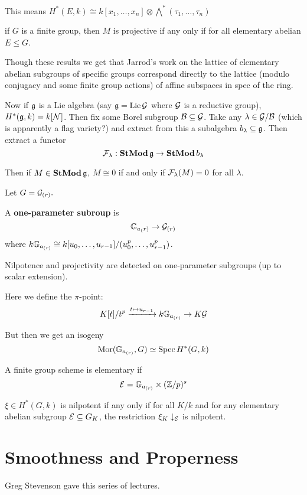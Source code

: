 \documentclass[12pt]{article}
\begin{document}
This means $H^\ast(E,k)\cong k[x_1,\dots,x_n]\otimes \bigwedge^\ast(\tau_1,\dots,\tau_n)$
\begin{thm}[Chouinard '76]
	if $G$ is a finite group, then $M$ is projective if any only if for all elementary abelian $E\le G$.
\end{thm}

Though these results we get that Jarrod's work on the lattice of elementary abelian subgroups of specific groups correspond directly to the lattice (modulo conjugacy and some finite 
group actions) of affine subspaces in spec of the ring.

Now if $\mathfrak{g}$ is a Lie algebra (say $\mathfrak{g}=\operatorname{Lie}\mathcal{G}$ where $\mathcal{G}$ is a reductive group), 
$H^\ast(\mathfrak{g},k)=k[\mathcal{N}]$. Then fix some Borel subgroup $\mathcal{B}\subseteq \mathcal{G}$. Take any $\lambda\in \mathcal{G}/\mathcal{B}$ (which is apparently a flag variety?)
and extract from this a subalgebra $b_\lambda\subseteq\mathfrak{g}$. Then extract a functor 
\[\mathcal{F}_\lambda:\operatorname{\mathbf{StMod}}\mathfrak{g}\to\operatorname{\mathbf{StMod}} b_\lambda\]
\begin{thm}
	Then if $M\in\operatorname{\mathbf{StMod}}\mathfrak{g}$, $M\cong 0$ if and only if $\mathcal{F}_\lambda(M)=0$ for all $\lambda.$
\end{thm}
Let $G=\mathcal{G}_{(r)}.$
\begin{defn}
	A \textbf{one-parameter subroup} is
	\[\mathbb{G}_{a_(r)}\to\mathcal{G}_{(r)}\]
	where $k\mathbb{G}_{a_{(r)}}\cong k[u_0,\dots,u_{r-1}]/(u_0^p,\dots, u_{r-1}^p)$.
\end{defn}
\begin{thm}
	Nilpotence and projectivity are detected on one-parameter subgroups (up to scalar extension).
\end{thm}
Here we define the $\pi$-point:
\[K[t]/t^p\xrightarrow{t\mapsto u_{r-1}} k\mathbb{G}_{a_{(r)}}\to K\mathcal{G}\]

\brk

But then we get an isogeny 
\[\operatorname{Mor}(\mathbb{G}_{a_{(r)}},G)\simeq\operatorname{Spec}H^\ast(G,k)\]

\begin{defn}
	A finite group scheme is elementary if 
	\[\mathcal{E}=\mathbb{G}_{a_{(r)}}\times(\mathbb{Z}/p)^s\]
\end{defn}
\begin{thm}[Suslin '76]
	$\xi\in H^\ast(G,k)$ is nilpotent if any only if for all $K/k$ and for any elementary abelian subgroup $\mathcal{E}\subseteq G_K$,
	the restriction $\xi_K\downarrow_{\mathcal{E}}$ is nilpotent.
\end{thm}

\section{Smoothness and Properness}
Greg Stevenson gave this series of lectures.
\end{document}
